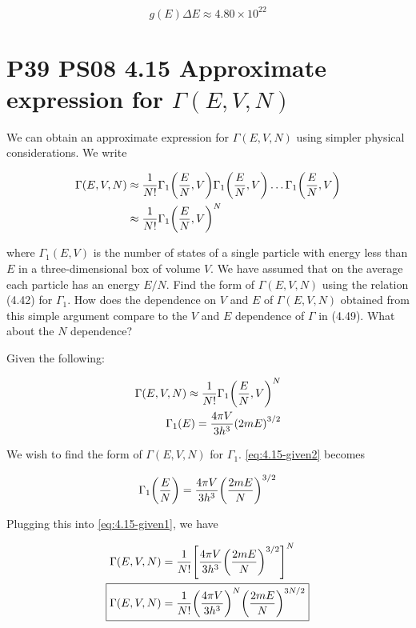 \documentclass[9pt,a4paper,twocolumn]{article}
\begin{document}
\begin{equation}
	\boxed{
		g(E)\Delta E \approx 4.80\times 10^{22}
	} \label{eq:answer}
\end{equation}

\section{P39 PS08 4.15 Approximate expression for $\Gamma(E,V,N)$}
We can obtain an approximate expression for $\Gamma(E, V,N)$ using simpler physical considerations. We write

\begin{align}
	\Gamma(E,V,N) &\approx \frac{1}{N!}\Gamma_1\qty(\frac{E}{N},V)\Gamma_1\qty(\frac{E}{N},V) \hdots \Gamma_1\qty(\frac{E}{N},V) \nonumber \\
	&\approx \frac{1}{N!}\Gamma_1\qty(\frac{E}{N},V)^N
\end{align}

where $\Gamma_1(E, V)$ is the number of states of a single particle with energy less than $E$ in a three-dimensional box of volume $V$. We have assumed that on the average each particle has an energy $E/N$. Find the form of $\Gamma(E, V,N)$ using the relation (4.42) for $\Gamma_1$. How does the dependence on $V$ and $E$ of $\Gamma(E, V,N)$ obtained from this simple argument compare to the $V$ and $E$ dependence of $\Gamma$ in (4.49). What about the $N$ dependence?

Given the following:

\begin{eqnarray}
	\Gamma(E,V,N) \approx \frac{1}{N!}\Gamma_1\qty(\frac{E}{N}, V)^N \label{eq:4.15-given1} \\
	\Gamma_1(E) = \frac{4\pi V}{3h^3}\qty(2mE)^{3/2} \label{eq:4.15-given2}
\end{eqnarray}

We wish to find the form of $\Gamma(E,V,N)$ for $\Gamma_1$. \eqref{eq:4.15-given2} becomes

\begin{equation}
	\Gamma_1\qty(\frac{E}{N}) = \frac{4\pi V}{3h^3}\qty(\frac{2mE}{N})^{3/2}
\end{equation}

Plugging this into \eqref{eq:4.15-given1}, we have

\begin{align}
	\Gamma(E,V,N) &= \frac{1}{N!}\qty[\frac{4\pi V}{3h^3}\qty(\frac{2mE}{N})^{3/2}]^N \nonumber \\
	\Aboxed{
		\Gamma(E,V,N) &= \frac{1}{N!}\qty(\frac{4\pi V}{3h^3})^N \qty(\frac{2mE}{N})^{3N/2}
	} \label{eq:4.15-answer}
\end{align}
\end{document}
